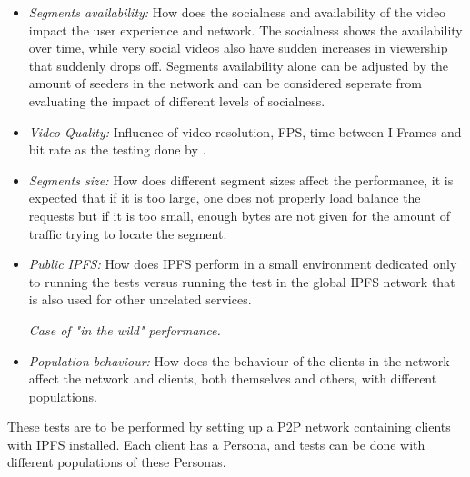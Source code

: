 \begin{itemize}
   \item \textit{Segments availability:}
    How does the socialness and availability of the video impact the user experience and network. The socialness shows the availability over time, while very social videos also have sudden increases in viewership that suddenly drops off. Segments availability alone can be adjusted by the amount of seeders in the network and can be considered seperate from evaluating the impact of different levels of socialness.
    
    \item \textit{Video Quality:}
    Influence of video resolution, \ac{FPS}, time between I-Frames and bit rate as the testing done by \citeauthor{aloman2015performance}.
    
    \item \textit{Segments size:}
    How does different segment sizes affect the performance, it is expected that if it is too large, one does not properly load balance the requests but if it is too small, enough bytes are not given for the amount of traffic trying to locate the segment.

    \item \textit{Public IPFS:}
    How does \ac{IPFS} perform in a small environment dedicated only to running the tests versus running the test in the global \ac{IPFS} network that is also used for other unrelated services.
    
    \textit{Case of "in the wild" performance.} 
    \item \textit{Population behaviour:}
    How does the behaviour of the clients in the network affect the network and clients, both themselves and others, with different populations.
\end{itemize}

These tests are to be performed by setting up a \ac{P2P} network containing clients with \ac{IPFS} installed. Each client has a Persona, and tests can be done with different populations of these Personas.

